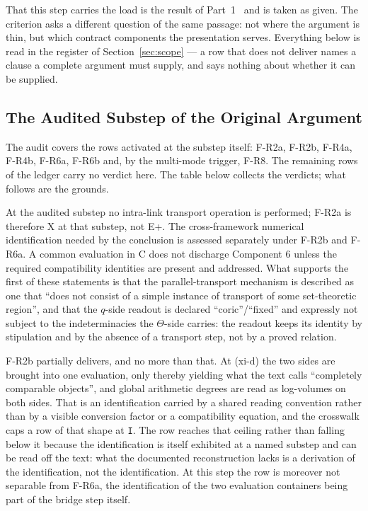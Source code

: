 \documentclass[11pt,a4paper]{article}
\begin{document}
That this step carries the load is the result of Part~1~\cite{part1} and is
taken as given. The criterion asks a different question of the same passage:
not where the argument is thin, but which contract components the presentation
serves. Everything below is read in the register of Section~\ref{sec:scope} ---
a row that does not deliver names a clause a complete argument must supply, and
says nothing about whether it can be supplied.

\subsection{The Audited Substep of the Original Argument}\label{sec:abc-original}

The audit covers the rows activated at the substep itself: F-R2a, F-R2b, F-R4a,
F-R4b, F-R6a, F-R6b and, by the multi-mode trigger, F-R8. The remaining rows of
the ledger carry no verdict here. The table below collects the verdicts; what
follows are the grounds.

At the audited substep no intra-link transport operation is performed; F-R2a is
therefore X at that substep, not E+. The cross-framework numerical
identification needed by the conclusion is assessed separately under F-R2b and
F-R6a. A common evaluation in C does not discharge Component 6 unless the
required compatibility identities are present and addressed. What supports the
first of these statements is that the parallel-transport mechanism is described
as one that ``does not consist of a simple instance of transport of some
set-theoretic region'', and that the $q$-side readout is declared
``coric''/``fixed'' and expressly not subject to the indeterminacies the
$\Theta$-side carries: the readout keeps its identity by stipulation and by the
absence of a transport step, not by a proved relation.

F-R2b partially delivers, and no more than that. At (xi-d) the two sides are
brought into one evaluation, only thereby yielding what the text calls
``completely comparable objects'', and global arithmetic degrees are read as
log-volumes on both sides. That is an identification carried by a shared reading
convention rather than by a visible conversion factor or a compatibility
equation, and the crosswalk caps a row of that shape at \texttt{I}. The row
reaches that ceiling rather than falling below it because the identification is
itself exhibited at a named substep and can be read off the text: what the
documented reconstruction lacks is a derivation of the identification, not the
identification. At this step the row is moreover not separable from F-R6a, the
identification of the two evaluation containers being part of the bridge step
itself.
\end{document}
